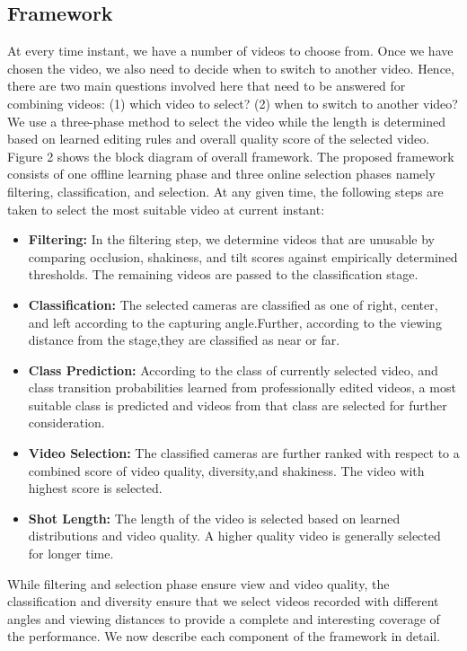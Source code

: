 \documentclass{sig-alternate}
\begin{document}
\subsection{Framework}
At every time instant, we have a number of videos to choose from. Once we have chosen the video, we also need to decide when to switch to another video. Hence, there are two main questions involved here that need to be answered for combining videos: (1) which video to select? (2) when to switch to another video? We use a three-phase method to select the video while the length is determined based on learned editing rules and overall quality score
of the selected video. Figure 2 shows the block diagram of overall framework. The
proposed framework consists of one offline learning phase and three online selection phases namely filtering, classification, and selection. At any given time, the following steps are taken to select the most suitable video at current instant:
\begin{itemize}
    \item \textbf{Filtering: }In the filtering step, we determine videos that are unusable by comparing occlusion, shakiness, and tilt scores against empirically determined thresholds. The remaining videos are passed to the classification stage.
    \item \textbf{Classification: }The selected cameras are classified as one of right, center, and left according to the capturing angle.Further, according to the viewing distance from the stage,they are classified as near or far.
    \item \textbf{Class Prediction: }According to the class of currently selected video, and class transition probabilities learned from professionally edited videos, a most suitable class is predicted and videos from that class are selected for further consideration.
    \item \textbf{Video Selection: }The classified cameras are further ranked with respect to a combined score of video quality, diversity,and shakiness. The video with highest score is selected.
    \item \textbf{Shot Length: }The length of the video is selected based on learned distributions and video quality. A higher quality video is generally selected for longer time.
\end{itemize}
While filtering and selection phase ensure view and video quality, the classification and diversity ensure that we select videos recorded with different angles and viewing distances to provide a complete and interesting coverage of the performance. We now describe each component of the framework in detail.
\end{document}
